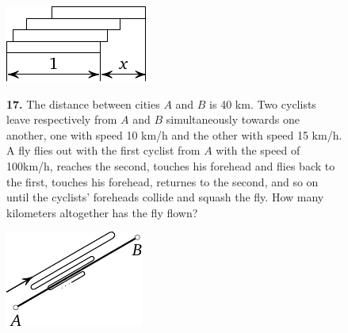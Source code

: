 \documentclass[12pt]{article}  %
\begin{document}
\begin{figure}[h!]
\centering
\footnotesize
\includegraphics[scale=1]{taskbook-97}
\end{figure}
\begin{figure}[h]
\begin{minipage}[c][][c]{0.7 \textwidth}
{\bf 17.} The distance between cities $A$ and $B$ is 40 km. Two cyclists leave respectively from $A$ and $B$ simultaneously
towards one another, one with speed 10 km/h and the other with speed 15 km/h. A fly flies out with the first
cyclist from $A$ with the speed of 100km/h, reaches the second, touches his forehead and flies back to the first,
touches his forehead, returnes to the second, and so on until the cyclists' foreheads collide and squash
the fly.
How many kilometers altogether has the fly flown?
\end{minipage}
\hfill
\begin{minipage}[c]{0.2 \textwidth}
\includegraphics[scale=1]{taskbook-1}
\end{minipage}
\end{figure}

\end{document}
